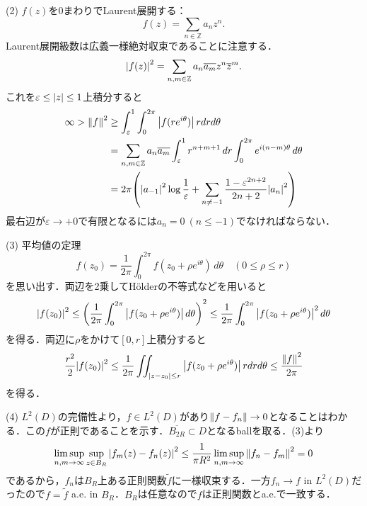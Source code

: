 \documentclass[a4j]{ltjsarticle}
\newcommand{\Zset}{\mathbb{Z}}
\newcommand{\1}{\mathbbm{1}}
\numberwithin{equation}{section}
\theoremstyle{definition}
\begin{document}
(2) $f(z)$を$0$まわりでLaurent展開する：
\begin{equation}
    f(z)=\sum_{n\in\Zset}a_nz^n.
\end{equation}
Laurent展開級数は広義一様絶対収束であることに注意する．
\begin{equation}
    \abs{f(z)}^2=\sum_{n,m\in\Zset}a_n\overline{a_m}z^n\overline{z}^m.
\end{equation}
これを$\varepsilon\leq \abs{z}\leq 1$上積分すると
\begin{align}
    \infty>\norm{f}^2&\geq \int_{\varepsilon}^{1}\int_{0}^{2\pi}\abs{f(re^{i\theta})}\,rdrd\theta\\
    &=\sum_{n,m\in\Zset}a_n\overline{a_m}\int_{\varepsilon}^{1}r^{n+m+1}\,dr\int_{0}^{2\pi}e^{i(n-m)\theta}\,d\theta\\
    &=2\pi\qty(\abs{a_{-1}}^2\log\frac{1}{\varepsilon}+\sum_{n\neq-1}\frac{1-\varepsilon^{2n+2}}{2n+2}\abs{a_n}^2)
\end{align}
最右辺が$\varepsilon\to+0$で有限となるには$a_n=0\ (n\leq -1)$でなければならない．

(3) 平均値の定理
\begin{equation}
    f(z_0)=\frac{1}{2\pi}\int_{0}^{2\pi}f(z_0+\rho e^{i\theta})\,d\theta\quad (0\leq \rho\leq r)
\end{equation}
を思い出す．両辺を2乗してHölderの不等式などを用いると
\begin{equation}
    \abs{f(z_0)}^2\leq \qty(\frac{1}{2\pi}\int_{0}^{2\pi}\abs{f(z_0+\rho e^{i\theta})}\,d\theta)^2\leq\frac{1}{2\pi}\int_{0}^{2\pi}\abs{f(z_0+\rho e^{i\theta})}^2\,d\theta 
\end{equation}
を得る．両辺に$\rho$をかけて$[0,r]$上積分すると
\begin{equation}
    \frac{r^2}{2}\abs{f(z_0)}^2\leq \frac{1}{2\pi}\iint_{\abs{z-z_0}\leq r}\abs{f(z_0+\rho e^{i\theta})}\,rdrd\theta\leq\frac{\norm{f}^2}{2\pi} 
\end{equation}
を得る．

(4) $L^2(D)$の完備性より，$f\in L^2(D)$があり$\norm{f-f_n}\to0$となることはわかる．この$f$が正則であることを示す．$\overline{B_{2R}}\subset D$となるballを取る．(3)より
\begin{equation}
    \limsup_{n,m\to\infty}\sup_{z\in B_R}\abs{f_m(z)-f_n(z)}^2\leq \frac{1}{\pi R^2}\limsup_{n,m\to\infty}\norm{f_n-f_m}^2=0
\end{equation}
であるから，$f_n$は$B_R$上ある正則関数$\widetilde{f}$に一様収束する．一方$f_n\to f$ in $L^2(D)$だったので$f=\widetilde{f}$ a.e. in $B_R$．$B_R$は任意なので$f$は正則関数とa.e.で一致する．
\end{document}
